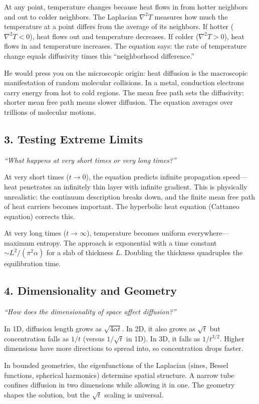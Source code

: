 At any point, temperature changes because heat flows in from hotter neighbors and out to colder neighbors. The Laplacian $\nabla^2 T$ measures how much the temperature at a point differs from the average of its neighbors. If hotter ($\nabla^2 T < 0$), heat flows out and temperature decreases. If colder ($\nabla^2 T > 0$), heat flows in and temperature increases. The equation says: the rate of temperature change equals diffusivity times this ``neighborhood difference.''

He would press you on the microscopic origin: heat diffusion is the macroscopic manifestation of random molecular collisions. In a metal, conduction electrons carry energy from hot to cold regions. The mean free path sets the diffusivity: shorter mean free path means slower diffusion. The equation averages over trillions of molecular motions.

\subsection*{3. Testing Extreme Limits}
\textit{``What happens at very short times or very long times?''}

At very short times ($t \to 0$), the equation predicts infinite propagation speed---heat penetrates an infinitely thin layer with infinite gradient. This is physically unrealistic: the continuum description breaks down, and the finite mean free path of heat carriers becomes important. The hyperbolic heat equation (Cattaneo equation) corrects this.

At very long times ($t \to \infty$), temperature becomes uniform everywhere---maximum entropy. The approach is exponential with a time constant $\sim L^2/(\pi^2 \alpha)$ for a slab of thickness $L$. Doubling the thickness quadruples the equilibration time.

\subsection*{4. Dimensionality and Geometry}
\textit{``How does the dimensionality of space affect diffusion?''}

In 1D, diffusion length grows as $\sqrt{4\alpha t}$. In 2D, it also grows as $\sqrt{t}$ but concentration falls as $1/t$ (versus $1/\sqrt{t}$ in 1D). In 3D, it falls as $1/t^{3/2}$. Higher dimensions have more directions to spread into, so concentration drops faster.

In bounded geometries, the eigenfunctions of the Laplacian (sines, Bessel functions, spherical harmonics) determine spatial structure. A narrow tube confines diffusion in two dimensions while allowing it in one. The geometry shapes the solution, but the $\sqrt{t}$ scaling is universal.


